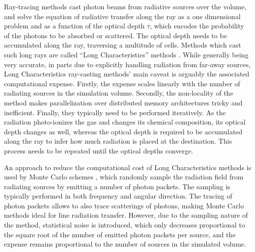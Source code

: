 Ray-tracing methods cast photon beams from radiative sources over the volume, and solve the equation
of radiative transfer along the ray as a one dimensional problem and as a function of the optical
depth $\tau$, which encodes the probability of the photons to be absorbed or scattered. The optical depth needs to be accumulated along the ray, traversing a multitude of cells. Methods which cast such long rays
are called ``Long Characteristics'' methods
\citep[e.g.][]{baczynskiFerventChemistrycoupledIonizing2015, grondTREVRGeneralLog2019,
susaSmoothedParticleHydrodynamics2006}.
While generally being very accurate, in parts due to explicitly handling radiation from far-away
sources, Long Characteristics ray-casting methods' main caveat is arguably the associated
computational expense. Firstly, the expense scales linearly with the number of radiating sources in
the simulation volume. Secondly, the non-locality of the method makes parallelization over
distributed memory architectures tricky and inefficient. Finally, they typically need to be
performed iteratively. As the radiation photo-ionizes the gas and changes its chemical composition, its optical depth changes as well, whereas the optical depth is required to be accumulated along the
ray to infer how much radiation is placed at the destination. This process needs to be repeated
until the optical depths converge.

An approach to reduce the computational cost of Long Characteristics methods is used by Monte
Carlo schemes \citep[e.g.][]{vandenbrouckeMonteCarloPhotoionization2018,
smithAREPOMCRTMonteCarlo2020, michel-dansacRASCASRAdiationSCattering2020, baekSimulated21Cm2009,
molaroARTISTFastRadiative2019, campsSKIRTAdvancedDust2015}, which randomly sample the radiation
field from radiating sources by emitting a number of photon packets. The sampling is typically
performed in both frequency and angular direction. The tracing of photon packets allows to also
trace scatterings of photons, making Monte Carlo methods ideal for line radiation transfer.
However, due to the sampling nature of the method, statistical noise is introduced, which only
decreases proportional to the square root of the number of emitted photon packets per source, and
the expense remains proportional to the number of sources in the simulated volume.

